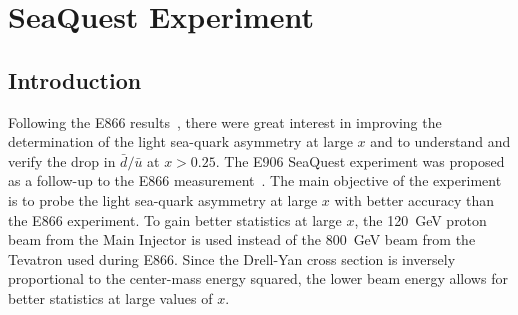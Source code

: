\documentclass[../main.tex]{subfiles}
\begin{document}
\ifSubfilesClassLoaded{
	\mainmatter
	\setcounter{chapter}{3}
}{}

\chapter{SeaQuest Experiment}
\label{ch:seaquest}

\section{Introduction}
Following the E866 results~\cite{towell2001}, there were great interest in improving
the determination of the light sea-quark asymmetry at large $x$ and to understand and verify
the drop in $\bar{d}/\bar{u}$ at $x>0.25$.
The E906 SeaQuest experiment was proposed as a follow-up to the E866 measurement~\cite{isenhower2001}.
The main objective of the experiment is to probe the light sea-quark asymmetry at
large $x$ with better accuracy than the E866 experiment.
To gain better statistics at large $x$, the \SI{120}{\GeV} proton beam from the Main
Injector is used instead of the \SI{800}{\GeV} beam from the Tevatron used during E866.
Since the Drell-Yan cross section is inversely proportional to the center-mass energy
squared, the lower beam energy allows for better statistics at large values of $x$.
\end{document}
